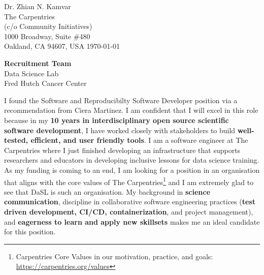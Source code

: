 


\clearpage
\begin{flushright}
  Dr. Zhian N. Kamvar\\
  The Carpentries\\
  (c/o Community Initiatives)\\
  1000 Broadway, Suite \#480\\
  Oakland, CA 94607, USA
  \today
\end{flushright}

\textbf{Recruitment Team} \\
Data Science Lab \\
Fred Hutch Cancer Center

\vspace{2ex}

I found the Software and Reproducibilty Software Developer position via a 
recommendation from Ciera Martinez. I am confident that I will excel in this
role because in my \textbf{10 years in interdisciplinary open source scientific
software development}, I have worked closely with stakeholders to build
\textbf{well-tested, efficient, and user friendly tools}. I am a software
engineer at The Carpentries where I just finished developing an infrastructure
that supports researchers and educators in developing inclusive lessons for
data science training. As my funding is coming to an end, I am looking for a
position in an organisation that aligns with the core values of The
Carpentries\footnote{Carpentries Core Values in our motivation, practice, and
goals: \url{https://carpentries.org/values}} and I am extremely glad to see
that DaSL is such an organisation. My background in \textbf{science
communication}, discipline in collaborative software engineering practices
(\textbf{test driven development, CI/CD, containerization}, and
project management), and \textbf{eagerness to learn and apply new skillsets}
makes me an ideal candidate for this position. 

\vspace{2ex}

